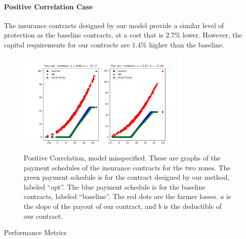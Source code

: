 \documentclass[11pt]{article}
\begin{document}
      \paragraph{Positive Correlation Case} The insurance contracts designed by our model provide a similar level of protection as the baseline contracts, at a cost that is $2.7\%$ lower. However, the capital requirements for our contracts are $1.4\%$ higher than the baseline. 
      \begin{figure}[H]
          \centering
          \includegraphics[width=0.75\textwidth]{../../output/figures/Exploration/pos_correlation_nonlinear.png}
          \caption{Positive Correlation, model misspecified. These are graphs of the payment schedules of the insurance contracts for the two zones. The green payment schedule is for the contract designed by our method, labeled ``opt''. The blue payment schedule is for the baseline contracts, labeled ``baseline''. The red dots are the farmer losses. $a$ is the slope of the payout of our contract, and $b$ is the deductible of our contract.}
      \end{figure}

      \begin{table}[H]
          \centering
          \small
          \caption{Performance Metrics}
          
      \end{table}
      \FloatBarrier
\end{document}
